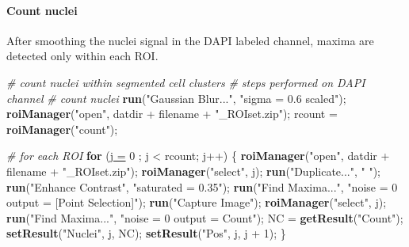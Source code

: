 \documentclass[11pt,singlespacinge,twoside]{reedthesis} %
\newenvironment{Shaded}{}{}
\newcommand{\CommentTok}[1]{\textit{#1}}
\newcommand{\ControlFlowTok}[1]{\textbf{#1}}
\newcommand{\DataTypeTok}[1]{\underline{#1}}
\newcommand{\DecValTok}[1]{#1}
\newcommand{\KeywordTok}[1]{\textbf{#1}}
\newcommand{\NormalTok}[1]{#1}
\newcommand{\OperatorTok}[1]{#1}
\newcommand{\StringTok}[1]{#1}
\theoremstyle{definition}
\theoremstyle{definition}
\theoremstyle{definition}
\theoremstyle{remark}
\begin{document}
\hypertarget{count-nuclei}{%
\paragraph{Count nuclei}\label{count-nuclei}}

After smoothing the nuclei signal in the DAPI labeled channel, maxima are detected only within each ROI.

\scriptsize
\begin{Shaded}
\begin{Highlighting}[numbers=left,,]
\CommentTok{# count nuclei within segmented cell clusters}
\CommentTok{# steps performed on DAPI channel}
\CommentTok{# count nuclei}
    \KeywordTok{run}\NormalTok{(}\StringTok{"Gaussian Blur..."}\NormalTok{, }\StringTok{"sigma = 0.6 scaled"}\NormalTok{);}
    \KeywordTok{roiManager}\NormalTok{(}\StringTok{"open"}\NormalTok{, datdir }\OperatorTok{+}\StringTok{ }\NormalTok{filename }\OperatorTok{+}\StringTok{ "_ROIset.zip"}\NormalTok{);}
\NormalTok{    rcount =}\StringTok{ }\KeywordTok{roiManager}\NormalTok{(}\StringTok{"count"}\NormalTok{);}

\CommentTok{# for each ROI}
    \ControlFlowTok{for}\NormalTok{ (}\DataTypeTok{j =} \DecValTok{0}\NormalTok{ ; j }\OperatorTok{<}\StringTok{ }\NormalTok{rcount; j}\OperatorTok{++}\NormalTok{) \{}
        \KeywordTok{roiManager}\NormalTok{(}\StringTok{"open"}\NormalTok{, datdir }\OperatorTok{+}\StringTok{ }\NormalTok{filename }\OperatorTok{+}\StringTok{ "_ROIset.zip"}\NormalTok{);}
        \KeywordTok{roiManager}\NormalTok{(}\StringTok{"select"}\NormalTok{, j);}
            \KeywordTok{run}\NormalTok{(}\StringTok{"Duplicate..."}\NormalTok{, }\StringTok{" "}\NormalTok{);}
            \KeywordTok{run}\NormalTok{(}\StringTok{"Enhance Contrast"}\NormalTok{, }\StringTok{"saturated = 0.35"}\NormalTok{);}
            \KeywordTok{run}\NormalTok{(}\StringTok{"Find Maxima..."}\NormalTok{, }\StringTok{"noise = 0 output = [Point Selection]"}\NormalTok{);}
            \KeywordTok{run}\NormalTok{(}\StringTok{"Capture Image"}\NormalTok{);}
        \KeywordTok{roiManager}\NormalTok{(}\StringTok{"select"}\NormalTok{, j);}
        \KeywordTok{run}\NormalTok{(}\StringTok{"Find Maxima..."}\NormalTok{, }\StringTok{"noise = 0 output = Count"}\NormalTok{);}
\NormalTok{        NC =}\StringTok{ }\KeywordTok{getResult}\NormalTok{(}\StringTok{"Count"}\NormalTok{);}
        \KeywordTok{setResult}\NormalTok{(}\StringTok{"Nuclei"}\NormalTok{, j, NC);}
        \KeywordTok{setResult}\NormalTok{(}\StringTok{"Pos"}\NormalTok{, j, j }\OperatorTok{+}\StringTok{ }\DecValTok{1}\NormalTok{);}
\NormalTok{    \}}
\end{Highlighting}
\end{Shaded}
\normalsize
\end{document}
